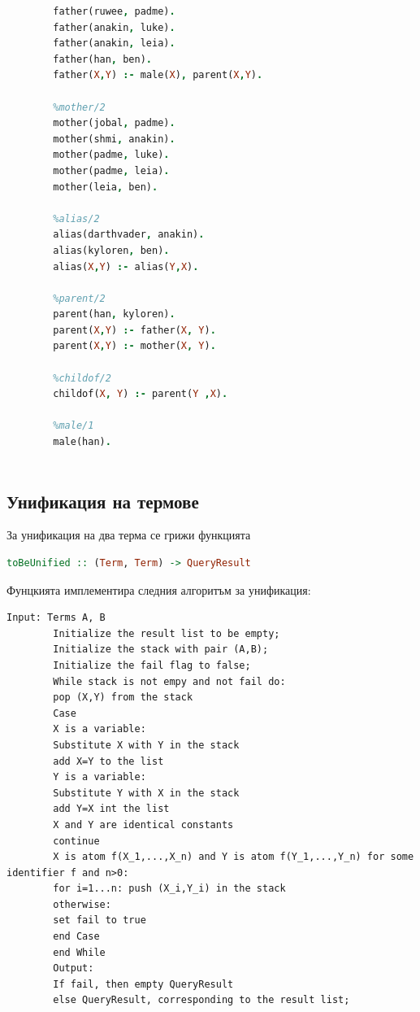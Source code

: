 \documentclass[15pt]{extarticle}
\begin{document}
	\begin{lstlisting}[language=Prolog,numbers=right]
		%father/2
		father(ruwee, padme).
		father(anakin, luke).
		father(anakin, leia).
		father(han, ben).
		father(X,Y) :- male(X), parent(X,Y).
		
		%mother/2
		mother(jobal, padme).
		mother(shmi, anakin).
		mother(padme, luke).
		mother(padme, leia).
		mother(leia, ben).
		
		%alias/2
		alias(darthvader, anakin).
		alias(kyloren, ben).
		alias(X,Y) :- alias(Y,X).
		
		%parent/2
		parent(han, kyloren).
		parent(X,Y) :- father(X, Y).
		parent(X,Y) :- mother(X, Y).
		
		%childof/2
		childof(X, Y) :- parent(Y ,X).
		
		%male/1
		male(han).
		
	\end{lstlisting}
	
	\subsection{Унификация на термове}
	
	За унификация на два терма се грижи функцията
	
	\begin{lstlisting}[language=haskell]
		toBeUnified :: (Term, Term) -> QueryResult
	\end{lstlisting}
	
	Фунцкията имплементира следния алгоритъм за унификация:
	
	\begin{lstlisting}[numbers=right]
		Input: Terms A, B
		Initialize the result list to be empty;
		Initialize the stack with pair (A,B);
		Initialize the fail flag to false;
		While stack is not empy and not fail do:
		pop (X,Y) from the stack
		Case
		X is a variable:
		Substitute X with Y in the stack
		add X=Y to the list
		Y is a variable:
		Substitute Y with X in the stack
		add Y=X int the list
		X and Y are identical constants 
		continue
		X is atom f(X_1,...,X_n) and Y is atom f(Y_1,...,Y_n) for some identifier f and n>0:
		for i=1...n: push (X_i,Y_i) in the stack
		otherwise:
		set fail to true
		end Case
		end While
		Output:
		If fail, then empty QueryResult
		else QueryResult, corresponding to the result list;
		
	\end{lstlisting}
\end{document}
